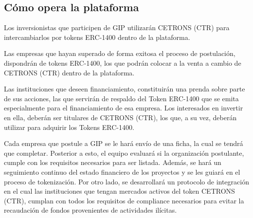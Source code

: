\subsection{Cómo opera la plataforma}
Los inversionistas que participen de GIP utilizarán CETRONS (CTR) para intercambiarlos por tokens ERC-1400 dentro de la plataforma.

Las empresas que hayan superado de forma exitosa el proceso de postulación, dispondrán de tokens ERC-1400, los que podrán colocar a la venta a cambio de CETRONS (CTR) dentro de la plataforma.

Las instituciones que deseen financiamiento, constituirán una prenda sobre parte de sus acciones, las que servirán de respaldo del Token ERC-1400 que se emita especialmente para el financiamiento de esa empresa. Los interesados en invertir en ella, deberán ser titulares de CETRONS (CTR), los que, a su vez, deberán utilizar para adquirir los Tokens ERC-1400.

Cada empresa que postule a GIP se le hará envío de una ficha, la cual se tendrá que completar. Posterior a esto, el equipo evaluará si la organización postulante, cumple con los requisitos necesarios para ser listada. Además, se hará un  seguimiento continuo del estado financiero de los proyectos y  se les guiará en el proceso de tokenización. Por otro lado, se desarrollará un  protocolo de integración en el cual las instituciones que tengan mercados activos del token CETRONS (CTR), cumplan con todos los requisitos de compliance necesarios para evitar la recaudación de fondos provenientes de actividades ilícitas.
